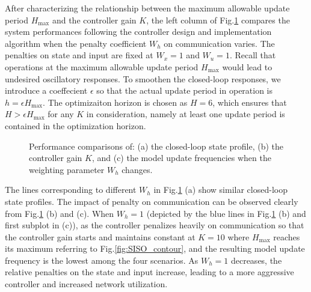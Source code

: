 \documentclass[letterpaper, 10 pt, conference]{ieeeconf}\IEEEoverridecommandlockouts%
\begin{document}
After characterizing the relationship between the maximum allowable update period $H_{\max}$ and the controller gain $K$, the left column of Fig.\ref{fig:SISO_performance} compares the system performances following the controller design and implementation algorithm when the penalty coefficient $W_h$ on communication varies. The penalties on state and input are fixed at $W_x = 1$ and $W_u = 1$. Recall that operations at the maximum allowable update period $H_{\max}$ would lead to undesired oscillatory responses. To smoothen the closed-loop responses, we introduce a coeffecient $\epsilon$ so that the actual update period in operation is $h = \epsilon H_{\max}$. The optimizaiton horizon is chosen as $H = 6$, which ensures that $H > \epsilon H_{\max}$ for any $K$ in consideration, namely at least one update period is contained in the optimization horizon.

\begin{figure}[hptb]
  \centerline{\hspace{2mm}\hspace{-4mm}{\footnotesize (a)}
  \hspace{-4mm}{\footnotesize (b)}}
  \centerline{\hspace{-4mm}{\footnotesize (c)}}
  \caption{Performance comparisons of: (a) the closed-loop state profile, (b) the controller gain $K$, and (c) the model update frequencies when the weighting parameter $W_h$ changes.}\label{fig:SISO_performance}
\end{figure}

The lines corresponding to different $W_h$ in Fig.\ref{fig:SISO_performance} (a) show similar closed-loop state profiles. The impact of penalty on communication can be observed clearly from Fig.\ref{fig:SISO_performance} (b) and (c). When $W_h = 1$ (depicted by the blue lines in Fig.\ref{fig:SISO_performance} (b) and first subplot in (c)), as the controller penalizes heavily on communication so that the controller gain starts and maintains constant at $K = 10$ where $H_{\max}$ reaches its maximum referring to Fig.\ref{fig:SISO_contour}, and the resulting model update frequency is the lowest among the four scenarios. As $W_h = 1$ decreases, the relative penalties on the state and input increase, leading to a more aggressive controller and increased network utilization.
\end{document}
